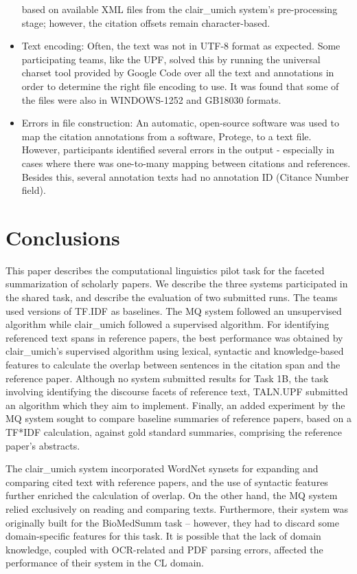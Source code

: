 \documentclass[11pt]{article}
\begin{document}
\begin{itemize}
  based on available XML files from the clair\_umich system's
  pre-processing stage; however, the citation offsets remain
  character-based.
\item{Text encoding: Often, the text was not in UTF-8 format as
  expected}. Some participating teams, like the UPF, solved this by
  running the universal charset tool provided by Google Code over all
  the text and annotations in order to determine the right file
  encoding to use. It was found that some of the files were also in
  WINDOWS-1252 and GB18030 formats.
\item{Errors in file construction:} An automatic, open-source software
  was used to map the citation annotations from a software, Protege,
  to a text file.  However, participants identified several errors in
  the output - especially in cases where there was one-to-many mapping
  between citations and references.  Besides this, several annotation
  texts had no annotation ID (Citance Number field).
\end{itemize}

\section{Conclusions}
This paper describes the computational linguistics pilot task for the
faceted summarization of scholarly papers. We describe the three
systems participated in the shared task, and describe the evaluation
of two submitted runs. The teams used versions of TF.IDF as baselines.
The MQ system followed an unsupervised algorithm while
clair\_umich followed a supervised algorithm. For identifying
referenced text spans in reference papers, the best performance was
obtained by clair\_umich's supervised algorithm using lexical,
syntactic and knowledge-based features to calculate the overlap
between sentences in the citation span and the reference
paper. Although no system submitted results for Task 1B, the task
involving identifying the discourse facets of reference text, TALN.UPF
submitted an algorithm which they aim to implement.  Finally, an added
experiment by the MQ system sought to compare baseline summaries of
reference papers, based on a TF*IDF calculation, against gold standard
summaries, comprising the reference paper's abstracts.
 
The clair\_umich system incorporated WordNet synsets for expanding and 
comparing cited text with reference papers, and the use of syntactic features 
further enriched the calculation of overlap. On the other hand, the MQ system 
relied exclusively on reading and comparing texts. Furthermore, their system 
was originally built for the BioMedSumm task -- however, they had to discard 
some domain-specific features for this task. It is possible that the lack of 
domain knowledge, coupled with OCR-related and PDF parsing errors, affected 
the performance of their system in the CL domain.
\end{document}
